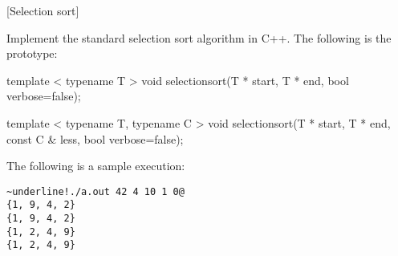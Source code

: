 [Selection sort]

Implement the standard selection sort algorithm in C++.
The following is the prototype:
\begin{console}[frame=single, fontsize=\footnotesize]
template < typename T >
void selectionsort(T * start, T * end, bool verbose=false);

template < typename T, typename C >
void selectionsort(T * start, T * end, const C & less, bool verbose=false);
\end{console}

The following is a sample execution:
\begin{Verbatim}[frame=single,commandchars=\~\!\@,fontsize=\footnotesize]
~underline!./a.out 42 4 10 1 0@
{1, 9, 4, 2}
{1, 9, 4, 2}
{1, 2, 4, 9}
{1, 2, 4, 9}
\end{Verbatim}

